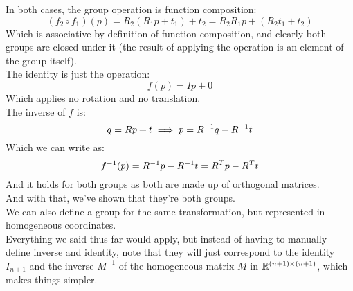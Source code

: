 \documentclass[12pt]{article}
\begin{document}
In both cases,
the group operation is function composition:
\[ (f_2 \circ f_1)(p) = R_2(R_1p + t_1) + t_2
= R_2R_1p + (R_2t_1 + t_2) \] 
Which is associative by definition of function
composition, and clearly both groups 
are closed under it
(the result of applying the operation
is an element of the group itself). \\

The identity is just the operation:
\[ f(p) = Ip + 0 \]
Which applies no rotation and no translation. \\

The inverse of $f$ is:
\[ q = Rp + t \implies  p = R^{-1} q - R^{-1} t \]
Which we can write as:
\[ f^{-1}(p) = R^{-1} p - R^{-1} t =
R^T p - R^T t \]
And it holds for both groups
as both are made up of orthogonal matrices. \\

And with that, we've shown that they're
both groups. \\

We can also define a group for the same
transformation, but represented
in homogeneous coordinates. \\
Everything we said thus far would apply,
but instead of having to manually define
inverse and identity,
note that they will just correspond
to the identity $I_{n+1}$
and the inverse $M^{-1}$
of the homogeneous matrix $M$ 
in $\mathbb{R}^{(n+1) \times (n+1)}$,
which makes things simpler. \\

\newpage
\end{document}
